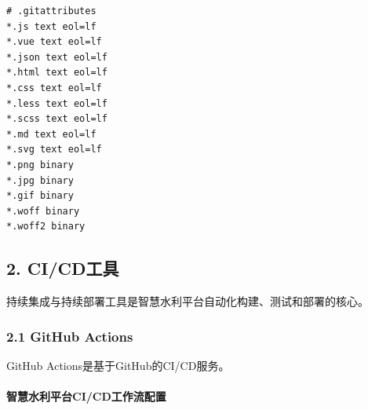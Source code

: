\begin{lstlisting}
# .gitattributes
*.js text eol=lf
*.vue text eol=lf
*.json text eol=lf
*.html text eol=lf
*.css text eol=lf
*.less text eol=lf
*.scss text eol=lf
*.md text eol=lf
*.svg text eol=lf
*.png binary
*.jpg binary
*.gif binary
*.woff binary
*.woff2 binary
\end{lstlisting}

\subsection{2. CI/CD工具}\label{cicdux5de5ux5177}

持续集成与持续部署工具是智慧水利平台自动化构建、测试和部署的核心。

\subsubsection{2.1 GitHub Actions}\label{github-actions}

GitHub Actions是基于GitHub的CI/CD服务。

\paragraph{智慧水利平台CI/CD工作流配置}\label{ux667aux6167ux6c34ux5229ux5e73ux53f0cicdux5de5ux4f5cux6d41ux914dux7f6e}

